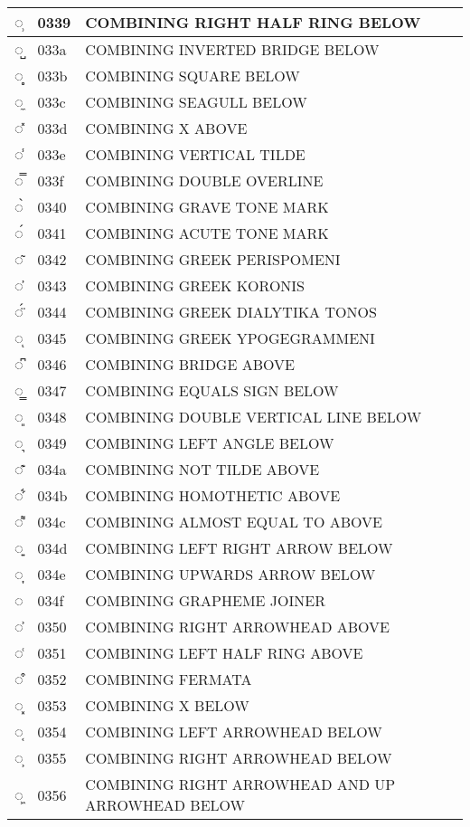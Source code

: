 \documentclass[12pt,letterpaper,openany]{book}
\begin{document}
\begin{center}
\begin{supertabular}{|m{0.25in}|m{0.5in}|m{4in}|}
◌̹ & 0339 & COMBINING RIGHT HALF RING BELOW\\\hline
◌̺ & 033a & COMBINING INVERTED BRIDGE BELOW\\\hline
◌̻ & 033b & COMBINING SQUARE BELOW\\\hline
◌̼ & 033c & COMBINING SEAGULL BELOW\\\hline
◌̽ & 033d & COMBINING X ABOVE\\\hline
◌̾ & 033e & COMBINING VERTICAL TILDE\\\hline
◌̿ & 033f & COMBINING DOUBLE OVERLINE\\\hline
◌̀ & 0340 & COMBINING GRAVE TONE MARK\\\hline
◌́ & 0341 & COMBINING ACUTE TONE MARK\\\hline
◌͂ & 0342 & COMBINING GREEK PERISPOMENI\\\hline
◌̓ & 0343 & COMBINING GREEK KORONIS\\\hline
◌̈́ & 0344 & COMBINING GREEK DIALYTIKA TONOS\\\hline
◌ͅ & 0345 & COMBINING GREEK YPOGEGRAMMENI\\\hline
◌͆ & 0346 & COMBINING BRIDGE ABOVE\\\hline
◌͇ & 0347 & COMBINING EQUALS SIGN BELOW\\\hline
◌͈ & 0348 & COMBINING DOUBLE VERTICAL LINE BELOW\\\hline
◌͉ & 0349 & COMBINING LEFT ANGLE BELOW\\\hline
◌͊ & 034a & COMBINING NOT TILDE ABOVE\\\hline
◌͋ & 034b & COMBINING HOMOTHETIC ABOVE\\\hline
◌͌ & 034c & COMBINING ALMOST EQUAL TO ABOVE\\\hline
◌͍ & 034d & COMBINING LEFT RIGHT ARROW BELOW\\\hline
◌͎ & 034e & COMBINING UPWARDS ARROW BELOW\\\hline
◌͏ & 034f & COMBINING GRAPHEME JOINER\\\hline
◌͐ & 0350 & COMBINING RIGHT ARROWHEAD ABOVE\\\hline
◌͑ & 0351 & COMBINING LEFT HALF RING ABOVE\\\hline
◌͒ & 0352 & COMBINING FERMATA\\\hline
◌͓ & 0353 & COMBINING X BELOW\\\hline
◌͔ & 0354 & COMBINING LEFT ARROWHEAD BELOW\\\hline
◌͕ & 0355 & COMBINING RIGHT ARROWHEAD BELOW\\\hline
◌͖ & 0356 & COMBINING RIGHT ARROWHEAD AND UP ARROWHEAD BELOW\\\hline

\end{supertabular}
\end{center}
\end{document}

